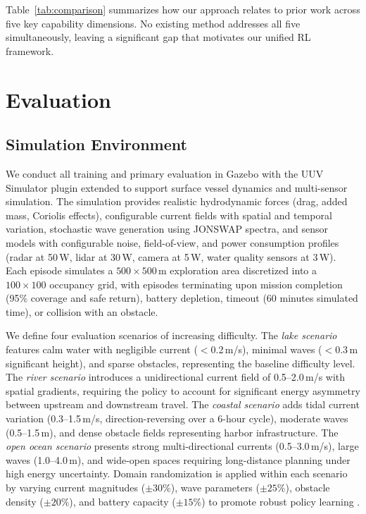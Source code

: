 \documentclass[conference]{IEEEtran}
\begin{document}
Table~\ref{tab:comparison} summarizes how our approach relates to prior work across five key capability dimensions. No existing method addresses all five simultaneously, leaving a significant gap that motivates our unified RL framework.


\section{Evaluation}

\subsection{Simulation Environment}

We conduct all training and primary evaluation in Gazebo \cite{Koenig2004Gazebo} with the UUV Simulator plugin \cite{Manhaes2016UUVSimulator} extended to support surface vessel dynamics and multi-sensor simulation. The simulation provides realistic hydrodynamic forces (drag, added mass, Coriolis effects), configurable current fields with spatial and temporal variation, stochastic wave generation using JONSWAP spectra, and sensor models with configurable noise, field-of-view, and power consumption profiles (radar at 50\,W, lidar at 30\,W, camera at 5\,W, water quality sensors at 3\,W). Each episode simulates a $500 \times 500$\,m exploration area discretized into a $100 \times 100$ occupancy grid, with episodes terminating upon mission completion (95\% coverage and safe return), battery depletion, timeout (60 minutes simulated time), or collision with an obstacle.

We define four evaluation scenarios of increasing difficulty.
The \textit{lake scenario} features calm water with negligible current ($<$0.2\,m/s), minimal waves ($<$0.3\,m significant height), and sparse obstacles, representing the baseline difficulty level. The \textit{river scenario} introduces a unidirectional current field of 0.5--2.0\,m/s with spatial gradients, requiring the policy to account for significant energy asymmetry between upstream and downstream travel. The \textit{coastal scenario} adds tidal current variation (0.3--1.5\,m/s, direction-reversing over a 6-hour cycle), moderate waves (0.5--1.5\,m), and dense obstacle fields representing harbor infrastructure. The \textit{open ocean scenario} presents strong multi-directional currents (0.5--3.0\,m/s), large waves (1.0--4.0\,m), and wide-open spaces requiring long-distance planning under high energy uncertainty. Domain randomization is applied within each scenario by varying current magnitudes ($\pm 30\%$), wave parameters ($\pm 25\%$), obstacle density ($\pm 20\%$), and battery capacity ($\pm 15\%$) to promote robust policy learning \cite{Tobin2017DomainRandomization, Peng2018SimToReal}.
\end{document}
